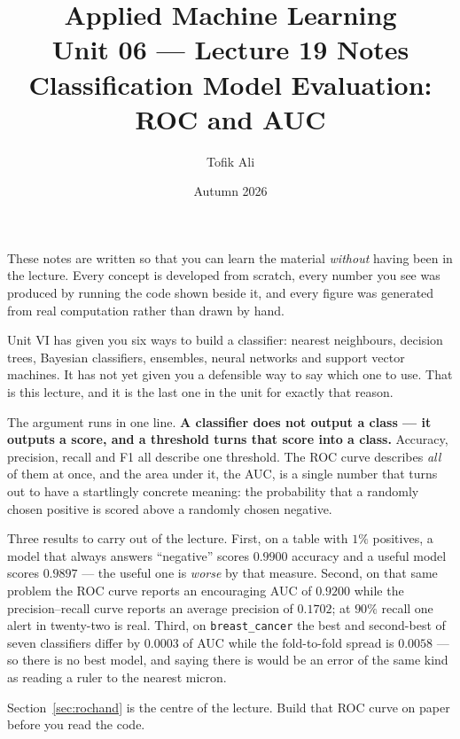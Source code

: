 \documentclass[11pt]{article}
\title{Applied Machine Learning\\Unit 06 --- Lecture 19 Notes\\
       Classification Model Evaluation: ROC and AUC}
\author{Tofik Ali}
\date{Autumn 2026}
\begin{document}
\maketitle

\begin{keyidea}
These notes are written so that you can learn the material \emph{without}
having been in the lecture. Every concept is developed from scratch, every
number you see was produced by running the code shown beside it, and every
figure was generated from real computation rather than drawn by hand.

Unit VI has given you six ways to build a classifier: nearest neighbours,
decision trees, Bayesian classifiers, ensembles, neural networks and support
vector machines. It has not yet given you a defensible way to say which one to
use. That is this lecture, and it is the last one in the unit for exactly that
reason.

The argument runs in one line. \textbf{A classifier does not output a class ---
it outputs a score, and a threshold turns that score into a class.} Accuracy,
precision, recall and F1 all describe one threshold. The ROC curve describes
\emph{all} of them at once, and the area under it, the AUC, is a single number
that turns out to have a startlingly concrete meaning: the probability that a
randomly chosen positive is scored above a randomly chosen negative.

Three results to carry out of the lecture. First, on a table with $1\%$
positives, a model that always answers ``negative'' scores $\mathbf{0.9900}$
accuracy and a useful model scores $\mathbf{0.9897}$ --- the useful one is
\emph{worse} by that measure. Second, on that same problem the ROC curve
reports an encouraging AUC of $\mathbf{0.9200}$ while the precision--recall
curve reports an average precision of $\mathbf{0.1702}$; at $90\%$ recall one
alert in twenty-two is real. Third, on \texttt{breast\_cancer} the best and
second-best of seven classifiers differ by $\mathbf{0.0003}$ of AUC while the
fold-to-fold spread is $\mathbf{0.0058}$ --- so there is no best model, and
saying there is would be an error of the same kind as reading a ruler to the
nearest micron.

Section~\ref{sec:rochand} is the centre of the lecture. Build that ROC curve
on paper before you read the code.
\end{keyidea}

\tableofcontents
\medskip

\end{document}
